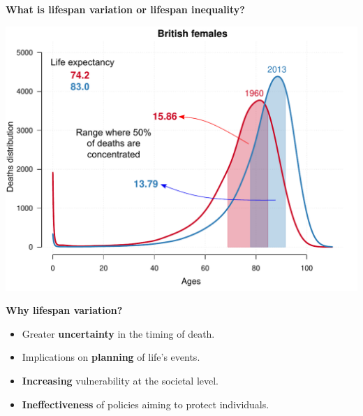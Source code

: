 \documentclass[xcolor={dvipsnames}]{beamer}
\begin{document}
\begin{frame}
	\begin{center}
		\Large{\textbf{What is lifespan variation or lifespan inequality?}}
	\end{center}


	\begin{center}
		\includegraphics[scale=.49]{Figures/DistribGBR2}
	\end{center}
			
\end{frame}

\begin{frame}
\LARGE{
\textbf{Why lifespan variation?}
		\begin{itemize}
		
		\item Greater \textbf{uncertainty} in the timing of death. \pause

		\item Implications on \textbf{planning} of life's events. \pause
		
		\item \textbf{Increasing} vulnerability at the societal level. \pause
		
		\item \textbf{Ineffectiveness} of policies aiming to protect individuals.
						
		\end{itemize}

}
\end{frame}
\end{document}
